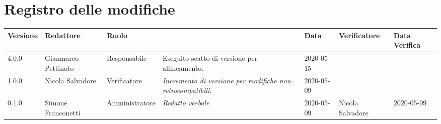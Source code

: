 \section*{Registro delle modifiche}
\renewcommand{\arraystretch}{1.8}

  \setlength\LTleft{-1.7cm}
  \begin{longtable}{|p{1.7cm}|p{2cm}|p{2.5cm}|p{3cm}|p{1.7cm}|p{2cm}|p{2.3cm}|}
    \hline

    \rowcolor{header}
    \textbf{Versione} & \textbf{Redattore} & \textbf{Ruolo} & \centering{\textbf{Descrizione}} & \textbf{Data} & \textbf{Verificatore} & \textbf{Data Verifica}\\

    \hline
    4.0.0 & Gianmarco Pettinato & Responsabile & Eseguito scatto di versione per allineamento. & 2020-05-15 & &\\
    1.0.0 & Nicola Salvadore & Verificatore & \small{\textit{Incremento di versione per modifiche non retrocompatibili.}} & 2020-05-09 & &\\
	0.1.0 & Simone Franconetti & Amministratore & \small{\textit{Redatto verbale}} & 2020-05-09 & Nicola Salvadore & 2020-05-09 \\
    \hline
  \end{longtable}
  \setlength\LTleft{0cm}
